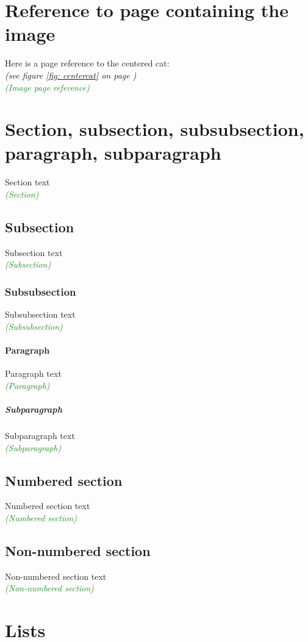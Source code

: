 \documentclass{article}
\newcommand{\ccheck}[1]{\textcolor{ForestGreen}{\emph{(\checkmark #1)}}} %
\begin{document}
\section{Reference to page containing the image}
Here is a page reference to the centered cat: \pageref{fig: centercat}\\
\emph{(see figure \ref{fig: centercat} on page \pageref{fig: centercat})}\\
\ccheck{Image page reference}

\section{Section, subsection, subsubsection, paragraph, subparagraph}
Section text\\
\ccheck{Section}
\subsection{Subsection}
Subsection text\\
\ccheck{Subsection}
\subsubsection{Subsubsection}
Subsubsection text\\
\ccheck{Subsubsection}
\paragraph{Paragraph}
Paragraph text\\
\ccheck{Paragraph}
\subparagraph{Subparagraph}
Subparagraph text\\
\ccheck{Subparagraph}


\subsection{Numbered section}
Numbered section text\\
\ccheck{Numbered section}

\subsection*{Non-numbered section}
Non-numbered section text\\
\ccheck{Non-numbered section}

\section{Lists}
\end{document}
